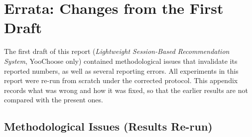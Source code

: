 
\chapter{Errata: Changes from the First Draft}
\label{app:errata}

The first draft of this report (\emph{Lightweight Session-Based Recommendation
System}, YooChoose only) contained methodological issues that invalidate its
reported numbers, as well as several reporting errors. All experiments in this
report were re-run from scratch under the corrected protocol. This appendix
records what was wrong and how it was fixed, so that the earlier results are not
compared with the present ones.

\section{Methodological Issues (Results Re-run)}

